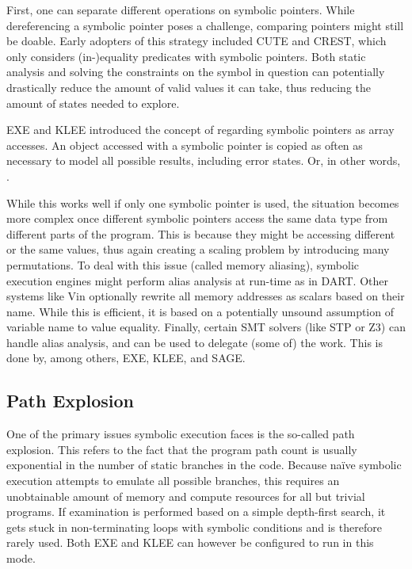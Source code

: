 \documentclass{article}
\begin{document}
\begin{multicols}{2}
  First, one can separate different operations on symbolic pointers. While dereferencing a symbolic pointer poses a challenge, comparing pointers might still be doable. Early adopters of this strategy included CUTE\cite{CUTE} and CREST\cite{CREST}, which only considers (in-)equality predicates with symbolic pointers. Both static analysis and solving the constraints on the symbol in question can potentially drastically reduce the amount of valid values it can take, thus reducing the amount of states needed to explore.

  EXE\cite{EXE} and KLEE\cite{KLEE} introduced the concept of regarding symbolic pointers as array accesses. An object accessed with a symbolic pointer is copied as often as necessary to model all possible results, including error states. Or, in other words, \cite{AllYouEverWanted}.

  While this works well if only one symbolic pointer is used, the situation becomes more complex once different symbolic pointers access the same data type from different parts of the program. This is because they might be accessing different or the same values, thus again creating a scaling problem by introducing many permutations. To deal with this issue (called memory aliasing), symbolic execution engines might perform alias analysis at run-time as in DART\cite{DART}. Other systems like Vin\cite{BitBlaze} optionally rewrite all memory addresses as scalars based on their name. While this is efficient, it is based on a potentially unsound assumption of variable name to value equality. Finally, certain SMT solvers (like STP\cite{STP} or Z3\cite{Z3}) can handle alias analysis, and can be used to delegate (some of) the work. This is done by, among others, EXE\cite{EXE}, KLEE\cite{KLEE}, and SAGE\cite{SAGE}.

  \subsection{Path Explosion}
  One of the primary issues symbolic execution faces is the so-called path explosion. This refers to the fact that the program path count is usually exponential in the number of static branches in the code. Because naïve symbolic execution attempts to emulate all possible branches, this requires an unobtainable amount of memory and compute resources for all but trivial programs. If examination is performed based on a simple depth-first search, it gets stuck in non-terminating loops with symbolic conditions and is therefore rarely used. Both EXE\cite{EXE} and KLEE\cite{KLEE} can however be configured to run in this mode.


\end{multicols}
\end{document}
